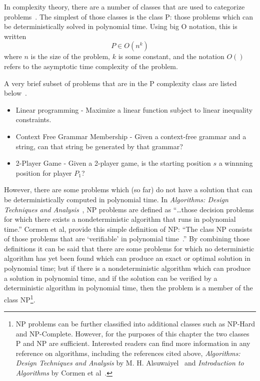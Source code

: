 In complexity theory, there are a number of classes that are used to categorize
problems~\cite{alsuwaiyel1999algorithms,Cormen:2009:IAT:1614191}. The simplest
of those classes is the class P: those problems which can be deterministically
solved in polynomial time. Using big O notation, this is written
\begin{equation*}
P \in O(n^{k})
\end{equation*}
where \(n\) is the size of the problem, \(k\) is some constant, and the
notation \(O()\) refers to the asymptotic time complexity of the problem.

A very brief subset of problems that are in the P complexity class are listed
below~\cite{greenlaw1991compendium}.

\begin{itemize}
\item{Linear programming - Maximize a linear function subject to linear
inequality constraints.} 
\item{Context Free Grammar Membership - Given a context-free grammar and a
string, can that string be generated by that grammar?}
\item {2-Player Game - Given a 2-player game, is the starting position \(s\) a
winnning position for player \(P_1\)?}
\end{itemize}

However, there are some problems which (so far) do not have a solution that can
be deterministically computed in polynomial time. In \emph{Algorithms: Design
Techniques and Analysis}~\cite{alsuwaiyel1999algorithms}, NP problems are
defined as ``\ldots those decision problems for which there exists a
nondeterministic algorithm that runs in polynomial time.'' Cormen et al, provide
this simple definition of NP: ``The class NP consists of those problems that are
`verifiable' in polynomial time~\cite{Cormen:2009:IAT:1614191}.'' By combining
those definitions it can be said that there are some problems for which no
deterministic algorithm has yet been found which can produce an exact or optimal
solution in polynomial time; but if there is a nondeterministic algorithm which
can produce a solution in polynomial time, and if the solution can be verified
by a deterministic algorithm in polynomial time, then the problem is a member of
the class NP\footnote{NP problems can be further classified into additional
classes such as NP-Hard and NP-Complete. However, for the purposes of this
chapter the two classes P and NP are sufficient. Interested readers can find
more information in any reference on algorithms, including the references cited
above, \emph{Algorithms: Design Techniques and Analysis} by M. H.
Alsuwaiyel~\cite{alsuwaiyel1999algorithms} and \emph{Introduction to Algorithms}
by Cormen et al~\cite{Cormen:2009:IAT:1614191}.}.

